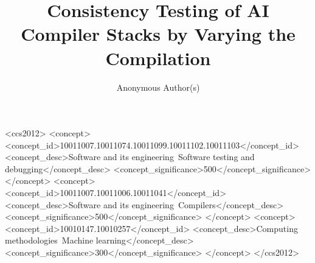 \documentclass[acmsmall,screen,review,anonymous]{acmart}
\begin{document}
\title{Consistency Testing of AI Compiler Stacks by Varying the Compilation}

\author{Anonymous Author(s)}



\begin{CCSXML}
<ccs2012>
<concept>
<concept_id>10011007.10011074.10011099.10011102.10011103</concept_id>
<concept_desc>Software and its engineering~Software testing and debugging</concept_desc>
<concept_significance>500</concept_significance>
</concept>
<concept>
<concept_id>10011007.10011006.10011041</concept_id>
<concept_desc>Software and its engineering~Compilers</concept_desc>
<concept_significance>500</concept_significance>
</concept>
<concept>
<concept_id>10010147.10010257</concept_id>
<concept_desc>Computing methodologies~Machine learning</concept_desc>
<concept_significance>300</concept_significance>
</concept>
</ccs2012>
\end{CCSXML}


\maketitle












\end{document}
